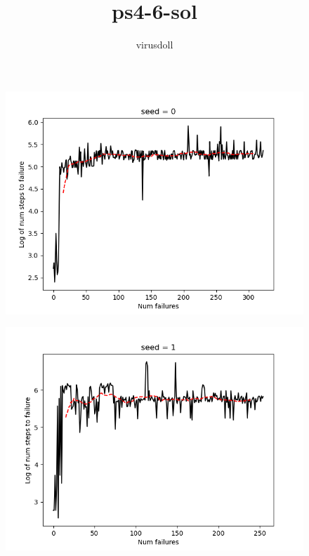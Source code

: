 \documentclass[11pt, a4paper]{article}
\title{ps4-6-sol}
\author{virusdoll}
\begin{document}
    \maketitle

    \begin{figure}[htbp]
        \centering
        \includegraphics[width=\linewidth]{figure/control_0.png}
    \end{figure}

    \begin{figure}[htbp]
        \centering
        \includegraphics[width=\linewidth]{figure/control_1.png}
    \end{figure}
\end{document}
